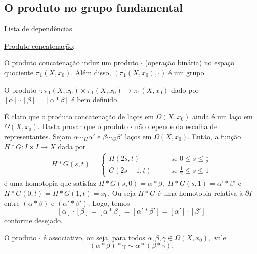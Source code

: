 \subsection{O produto no grupo fundamental} %
\label{produto-bem-definido-prop}
\begin{titlemize}{Lista de dependências}
	\item \hyperref[Produto-grupo-fundamental-def]{Produto concatenação};\\ %
\end{titlemize}
O produto concatenação induz um produto $\cdot$ (operação binária) no espaço quociente $\pi_1(X,x_0)$. Além disso, $(\pi_1(X,x_0),\cdot)$ é um grupo.

\begin{lemma}%
    O produto $\cdot:\pi_1(X,x_0)\times\pi_1(X,x_0)\rightarrow \pi_1(X,x_0)$ dado por $[\alpha]\cdot[\beta]=[\alpha*\beta]$ é bem definido.
\end{lemma}

\begin{dem}
    É claro que o produto concatenação de laços em $\Omega(X,x_0)$ ainda é um laço em $\Omega(X,x_0).$ Basta provar que o produto $\cdot$ não depende da escolha de representantes. Sejam $\alpha\sim_H \alpha'$ e $\beta\sim_G\beta'$ laços em $\Omega(X,x_0)$. Então, a função $H*G:I\times I\rightarrow X$ dada por 
    \begin{align*}
        H*G(s,t)=\begin{cases}
            H(2s,t)\;\;\;&\;\;\;\mbox{ se }0\le s\le \frac{1}{2}\\
            G(2s-1,t)\;\;\;&\;\;\;\mbox{ se }\frac{1}{2}\le s\le1
        \end{cases}
    \end{align*}
    é uma homotopia que satisfaz $H*G(s,0)=\alpha*\beta,$ $H*G(s,1)=\alpha'*\beta'$ e $H*G(0,t)=H*G(1,t)=x_0.$ Ou seja $H*G$ é uma homotopia relativa à $\partial I$ entre $(\alpha*\beta)$ e $(\alpha'*\beta').$ Logo, temos  
    $$[\alpha]\cdot[\beta]=[\alpha*\beta]=[\alpha'*\beta']=[\alpha']\cdot [\beta']$$
    conforme desejado.
\end{dem}

\begin{lemma}
    O produto $\cdot$ é associativo, ou seja, para todos $\alpha,\beta,\gamma\in\Omega(X,x_0),$ vale
    \[(\alpha*\beta)*\gamma\sim \alpha*(\beta*\gamma).\]
\end{lemma}

